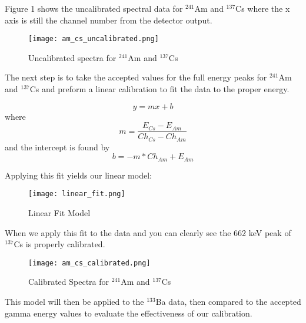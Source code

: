 Figure 1 shows the uncalibrated spectral data for $^{241}$Am and $^{137}$Cs where the x axis is still
the channel number from the detector output.

\begin{figure}[H]
  \centering
  \texttt{[image: am\_cs\_uncalibrated.png]}
  \caption{Uncalibrated spectra for $^{241}$Am and $^{137}$Cs}
  \label{fig:uncalspectra}
\end{figure}


The next step is to take the accepted values for the full energy peaks for $^{241}$Am and $^{137}$Cs and preform
a linear calibration to fit the data to the proper energy.
\begin{center}
  \begin{equation}
    \label{eq:cal}
    y = mx+b
  \end{equation}
  where
  \begin{equation}
    \label{eq:slope}
    m = \frac{E_{Cs} - E_{Am}}{Ch_{Cs}-Ch_{Am}}
  \end{equation}
  and the intercept is found by
  \begin{equation}
    \label{eq:slope}
    b = -m*Ch_{Am} + E_{Am}
  \end{equation}
\end{center}
  Applying this fit yields our linear model:

\begin{figure}[H]
  \begin{center}
    \texttt{[image: linear\_fit.png]}
    \caption{\label{fig:linfit}Linear Fit Model}
  \end{center}
\end{figure}


 When we apply this fit to the data and you can clearly see the 662 keV peak of $^{137}$Cs is properly calibrated.

 \begin{figure}[H]
   \begin{center}
     \texttt{[image: am\_cs\_calibrated.png]}
     \caption{\label{fig:linfit}Calibrated Spectra for $^{241}$Am and $^{137}$Cs }
   \end{center}
 \end{figure}

 This model will then be applied to the $^{133}$Ba data, then compared to the accepted gamma energy values to
 evaluate the effectiveness of our calibration.
